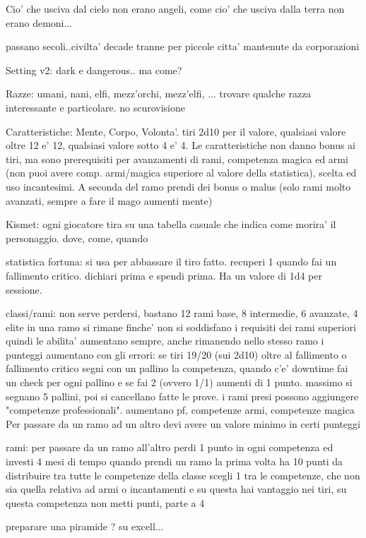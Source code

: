 \documentclass[12pt,a4paper,twoside,openany,twocolumn]{book}
\begin{document}
Cio' che usciva dal cielo non erano angeli, come cio' che usciva dalla terra non erano demoni...

passano secoli..civilta' decade tranne per piccole citta' mantenute da corporazioni


Setting v2: dark e dangerous.. ma come?


Razze: umani, nani, elfi, mezz'orchi, mezz'elfi, ... trovare qualche razza interessante e particolare. no scurovisione

Caratteristiche: Mente, Corpo, Volonta'. tiri 2d10 per il valore, qualsiasi valore oltre 12 e' 12, qualsiasi valore sotto 4 e' 4.
Le caratteristiche non danno bonus ai tiri, ma sono prerequisiti per avanzamenti di rami, competenza magica ed armi (non puoi avere comp. armi/magica superiore al valore della statistica), scelta ed uso incantesimi. A seconda del ramo prendi dei bonus o malus (solo rami molto avanzati, sempre a fare il mago aumenti mente)


Kismet: ogni giocatore tira su una tabella casuale che indica come morira' il personaggio. dove, come, quando

statistica fortuna: si usa per abbassare il tiro fatto. recuperi 1 quando fai un fallimento critico. dichiari prima e spendi prima.
Ha un valore di 1d4 per sessione.

classi/rami: non serve perdersi, bastano 12 rami base, 8 intermedie, 6 avanzate, 4 elite
in una ramo si rimane finche' non si soddisfano i requisiti dei rami superiori
quindi le abilita' aumentano sempre, anche rimanendo nello stesso ramo
i punteggi aumentano con gli errori: se tiri 19/20 (sui 2d10) oltre al fallimento o fallimento critico segni con un pallino la competenza, quando c'e' downtime fai un check per ogni pallino e se fai 2 (ovvero 1/1) aumenti di 1 punto. massimo si segnano 5 pallini, poi si cancellano fatte le prove.
i rami presi possono aggiungere "competenze professionali". aumentano pf, competenze armi, competenze magica Per passare da un ramo ad un altro devi avere un valore minimo in certi punteggi

rami: 
per passare da un ramo all'altro perdi 1 punto in ogni competenza ed investi 4 mesi di tempo
quando prendi un ramo la prima volta ha 10 punti da distribuire tra tutte le competenze della classe
scegli 1 tra le competenze, che non sia quella relativa ad armi o incantamenti e su questa hai vantaggio nei tiri, su questa competenza non metti punti, parte a 4


preparare una piramide ? su excell...
\end{document}
